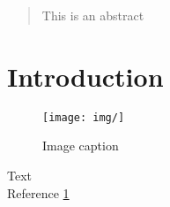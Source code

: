 \begin{abstract}
This is an abstract
\end{abstract}

\section{Introduction}

\begin{figure}[h]
	\centering
	\texttt{[image: img/]}
	\caption[short caption]{Image caption}
	\label{fig:}
\end{figure}

Text\\

Reference \ref{fig:}\\
